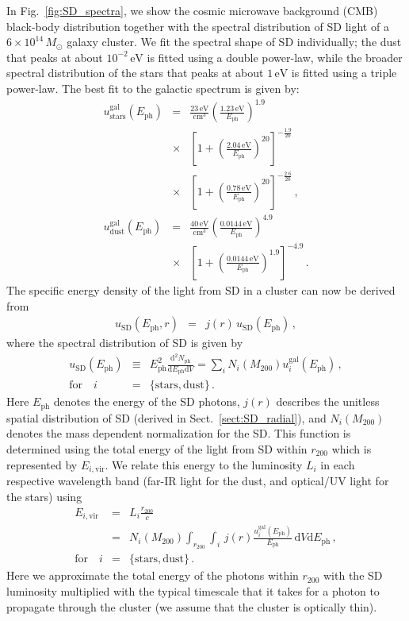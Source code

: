 \documentclass[10pt,aps,pra,reprint,amsmath,amsfonts,amssymb,showpacs,nofootinbib,floatfix]{revtex4-1}
\newcommand{\rmn}{\mathrm}
\newcommand{\ph}{\rmn{ph}}
\newcommand{\eph}{E_\ph}
\newcommand{\vir}{\rmn{vir}}
\newcommand{\gal}{\rmn{gal}}
\newcommand{\sd}{\rmn{SD}}
\newcommand{\msun}{M_\odot}
\newcommand{\stars}{\rmn{stars}}
\newcommand{\dust}{\rmn{dust}}
\newcommand{\ev}{\rmn{eV}}
\newcommand{\dd}{\rmn{d}}
\newcommand{\rvir}{r_{200}}
\newcommand{\mvir}{M_{200}}
\begin{document}
In Fig.~\ref{fig:SD_spectra}, we show the cosmic microwave background
(CMB) black-body distribution together with the spectral distribution
of SD light of a $6\times10^{14}\,\msun$ galaxy cluster. We fit the
spectral shape of SD individually; the dust that peaks at about
$10^{-2}\,\ev$ is fitted using a double power-law, while the broader
spectral distribution of the stars that peaks at about $1\,\ev$ is
fitted using a triple power-law. The best fit to the galactic spectrum
is given by:
\begin{eqnarray}
  u_\stars^\gal(\eph) &=& \frac{23\,\rmn{eV}}{\rmn{cm}^3} 
  \left(\frac{1.23\,\rmn{eV}}{\eph}\right)^{1.9} \nonumber \\
  &\times&\left[1+\left(\frac{2.04\,\rmn{eV}}{\eph}\right)^{20}\right]
  ^{-\frac{1.9}{20}}\nonumber \\
  &\times& \left[1+\left(\frac{0.78\,\rmn{eV}}{\eph}\right)^{20}\right]^{-\frac{2.6}{20}}\,, \\
  u_\dust^\gal(\eph) &=& 
  \frac{40\,\rmn{eV}}{\rmn{cm}^3} 
  \left(\frac{0.0144\,\rmn{eV}}{\eph}\right)^{4.9}\nonumber \\
  &\times& \left[1+\left(\frac{0.0144\,\rmn{eV}}{\eph}\right)^{1.9}\right]^{-4.9}\,.
\end{eqnarray}
The specific energy density of the light from SD in a cluster can now
be derived from
\begin{eqnarray} 
u_\sd(\eph, r) &=& j(r)\,u_\sd(\eph)\,,
\label{eq:u_SD_er}
\end{eqnarray}
where the spectral distribution of SD is given by
\begin{eqnarray}
  u_\sd(\eph) &\equiv& \eph^2\frac{\dd^2 N_\ph}{\dd \eph \dd V}
  =  \sum_i N_i(\mvir) u_i^\gal(\eph)\,,\nonumber \\ 
\rmn{for}\quad i&=&\{\rmn{stars,dust}\}\,.
\end{eqnarray}
Here $\eph$ denotes the energy of the SD photons, $j(r)$ describes the
unitless spatial distribution of SD (derived in
Sect.~\ref{sect:SD_radial}), and $N_i(\mvir)$ denotes the mass
dependent normalization for the SD. This function is determined using
the total energy of the light from SD within $\rvir$ which is
represented by $E_{i,\vir}$. We relate this energy to the luminosity
$L_i$ in each respective wavelength band (far-IR light for the
dust, and optical/UV light for the stars) using
\begin{eqnarray} 
  E_{i,\vir} &=& L_i \frac{\rvir}{c} \nonumber \\
  &=&N_i(\mvir)\int_{\rvir} \int_i \,j(r) 
  \frac{u_i^\gal(\eph)}{\eph}\,\dd V\dd \eph\,,\nonumber \\
 \rmn{for}\quad i&=&\{\rmn{stars,dust}\}\,.
\label{eq:E_SD}
\end{eqnarray}
Here we approximate the total energy of the photons within $\rvir$
with the SD luminosity multiplied with the typical timescale that it
takes for a photon to propagate through the cluster (we assume that
the cluster is optically thin).
\end{document}
